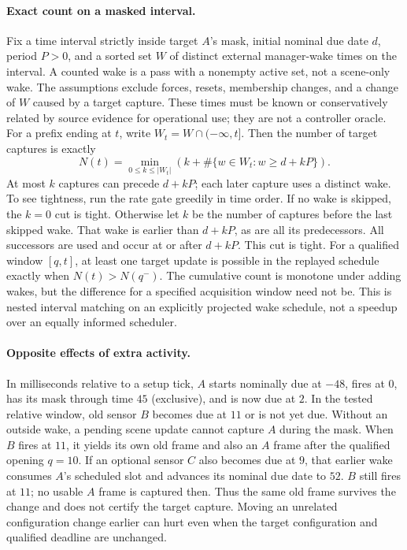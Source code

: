 \documentclass{article}
\begin{document}
\paragraph{Exact count on a masked interval.}
Fix a time interval strictly inside target \(A\)'s mask, initial nominal
due date \(d\), period \(P>0\), and a sorted set \(W\) of distinct
external manager-wake times on the interval. A counted wake is a pass
with a nonempty active set, not a scene-only wake. The assumptions
exclude forces, resets, membership changes, and a change of \(W\) caused
by a target capture. These times must be known or conservatively related
by source evidence for operational use; they are not a controller
oracle. For a prefix ending at \(t\), write \(W_t=W\cap(-\infty,t]\).
Then the number of target captures is exactly
\[
 N(t)=\min_{0\le k\le |W_t|}
   \left(k+\#\{w\in W_t:w\ge d+kP\}\right).
\]
At most \(k\) captures can precede \(d+kP\); each later capture
uses a distinct wake. To see tightness, run the rate gate greedily in
time order. If no wake is skipped, the \(k=0\) cut is tight.
Otherwise let \(k\) be the number of captures before the last skipped
wake. That wake is earlier than \(d+kP\), as are all its predecessors.
All successors are used and occur at or after \(d+kP\). This cut is
tight. For a qualified window \([q,t]\), at least one target update
is possible in the replayed schedule exactly when \(N(t)>N(q^-)\).
The cumulative count is monotone under adding wakes, but the
difference for a specified acquisition window need not be. This is
nested interval matching on an explicitly projected wake schedule,
not a speedup over an equally informed scheduler.

\paragraph{Opposite effects of extra activity.}
In milliseconds relative to a setup tick, \(A\) starts nominally due
at \(-48\), fires at \(0\), has its mask through time \(45\)
(exclusive), and is now due at \(2\). In the tested relative window,
old sensor \(B\) becomes due at \(11\) or is not yet due. Without an
outside wake, a pending scene update cannot capture \(A\) during
the mask. When \(B\) fires at \(11\), it yields its own old frame and
also an \(A\) frame after the qualified opening \(q=10\).
If an optional sensor \(C\) also becomes due at \(9\), that earlier
wake consumes \(A\)'s scheduled slot and advances its nominal due
date to \(52\). \(B\) still fires at \(11\); no usable \(A\) frame
is captured then. Thus the same old frame survives the change and
does not certify the target capture. Moving an unrelated configuration
change earlier can hurt even when the target configuration and
qualified deadline are unchanged.
\end{document}
